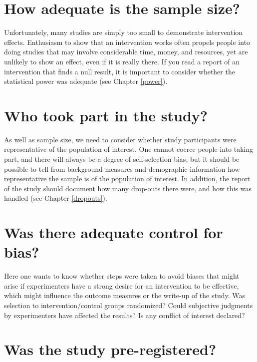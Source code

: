 \documentclass{krantz}
\begin{document}
\hypertarget{how-adequate-is-the-sample-size}{%
\section{How adequate is the sample size?}\label{how-adequate-is-the-sample-size}}

Unfortunately, many studies are simply too small to demonstrate intervention effects. Enthusiasm to show that an intervention works often propels people into doing studies that may involve considerable time, money, and resources, yet are unlikely to show an effect, even if it is really there. If you read a report of an intervention that finds a null result, it is important to consider whether the statistical power was adequate (see Chapter \ref{power}).

\hypertarget{who-took-part-in-the-study}{%
\section{Who took part in the study?}\label{who-took-part-in-the-study}}

As well as sample size, we need to consider whether study participants were representative of the population of interest. One cannot coerce people into taking part, and there will always be a degree of self-selection bias, but it should be possible to tell from background measures and demographic information how representative the sample is of the population of interest. In addition, the report of the study should document how many drop-outs there were, and how this was handled (see Chapter \ref{dropouts}).

\hypertarget{was-there-adequate-control-for-bias}{%
\section{Was there adequate control for bias?}\label{was-there-adequate-control-for-bias}}

Here one wants to know whether steps were taken to avoid biases that might arise if experimenters have a strong desire for an intervention to be effective, which might influence the outcome measures or the write-up of the study. Was selection to intervention/control groups randomized? Could subjective judgments by experimenters have affected the results? Is any conflict of interest declared?

\hypertarget{was-the-study-pre-registered}{%
\section{Was the study pre-registered?}\label{was-the-study-pre-registered}}
\end{document}
